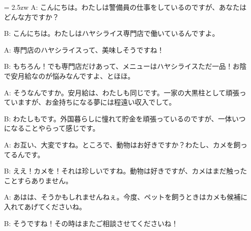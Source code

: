 \documentclass[11pt]{amsart}
\title{}
\author{}
\newenvironment{hangall}[1]{\hangindent = 2.5zw\everypar{\hangindent = 2.5zw}}{}
\begin{document}
\maketitle
\begin{hangall}{}%
A: こんにちは。わたしは警備員の仕事をしているのですが、あなたはどんな方ですか？



B: こんにちは。わたしはハヤシライス専門店で働いているんですよ。



A: 専門店のハヤシライスって、美味しそうですね！



B: もちろん！でも専門店だけあって、メニューはハヤシライスただ一品！お陰で安月給なのが悩みなんですよ、とほほ。



A: そうなんですか。安月給は、わたしも同じです。一家の大黒柱として頑張っていますが、お金持ちになる夢には程遠い収入でして。



B: わたしもです。外国暮らしに憧れて貯金を頑張っているのですが、一体いつになることやらって感じです。



A: お互い、大変ですね。ところで、動物はお好きですか？わたし、カメを飼ってるんです。



B: ええ！カメを！それは珍しいですね。動物は好きですが、カメはまだ触ったことすらありません。



A: あはは、そうかもしれませんねぇ。今度、ペットを飼うときはカメも候補に入れてあげてくださいね。



B: そうですね！その時はまたご相談させてくださいね！\end{hangall}
\end{document}
